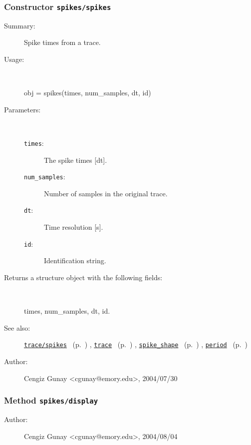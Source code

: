 \subsubsection[Constructor \texttt{spikes}]{Constructor \texttt{spikes/spikes}}%
%
\label{ref_spikes__spikes}%
\hypertarget{ref_spikes__spikes}{}%
\begin{description}
\item[Summary:]Spike times from a trace.
%
\item[Usage:]~%
\begin{lyxcode}%
obj = spikes(times, num\_samples, dt, id)
%
\end{lyxcode}%
%
%
\item[Parameters:]~
\begin{description}%
\item[\texttt{times}:]
 The spike times [dt].
\item[\texttt{num\_samples}:]
 Number of samples in the original trace.
\item[\texttt{dt}:]
 Time resolution [s].
\item[\texttt{id}:]
 Identification string.
\end{description}%
%
\item[Returns a structure object with the following fields:]~

	times, num\_samples, dt, id.
%
%
\item[See also:]%
\hyperlink{ref_trace__spikes}{\texttt{trace/spikes}}%
\ (p.~\pageref{ref_trace__spikes})%
%
, \hyperlink{ref_trace}{\texttt{trace}}%
\ (p.~\pageref{ref_trace})%
%
, \hyperlink{ref_spike_shape}{\texttt{spike\_shape}}%
\ (p.~\pageref{ref_spike_shape})%
%
, \hyperlink{ref_period}{\texttt{period}}%
\ (p.~\pageref{ref_period})%
%
%
\item[Author:]%
Cengiz Gunay <cgunay@emory.edu>, 2004/07/30%
\end{description}
\methodline%
\subsubsection[Method \texttt{display}]{Method \texttt{spikes/display}}%
%
\label{ref_spikes__display}%
\hypertarget{ref_spikes__display}{}%
\begin{description}
%
%
%
%
%
%
%
\item[Author:]%
Cengiz Gunay <cgunay@emory.edu>, 2004/08/04%
\end{description}
\methodline%
